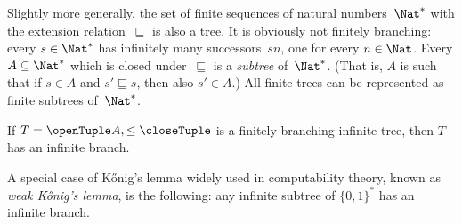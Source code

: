 \documentclass[../../../include/open-logic-section]{subfiles}
\begin{document}
\begin{ex}
Slightly more generally, the set of finite sequences of natural
numbers~$\Nat^*$ with the extension relation~$\sqsubseteq$ is also a
tree. It is obviously not finitely branching: every $s \in \Nat^*$ has
infinitely many successors~$sn$, one for every $n \in \Nat$. Every $A
\subseteq \Nat^*$ which is closed under~$\sqsubseteq$ is a
\emph{subtree} of~$\Nat^*$. (That is, $A$ is such that if $s \in A$
and $s' \sqsubseteq s$, then also $s' \in A$.) All finite trees can be
represented as finite subtrees of~$\Nat^*$.
\end{ex}

\begin{prop}
If $T = \tuple{A,\le}$ is a finitely branching infinite tree,
then $T$ has an infinite branch.
\end{prop}

A special case of K\H{o}nig's lemma widely used in computability
theory, known as \emph{weak K\H{o}nig's lemma}, is the following: any
infinite subtree of $\{0,1\}^*$ has an infinite branch.
\end{document}
